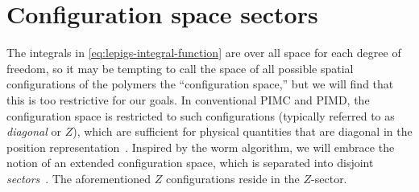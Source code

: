 \section{Configuration space sectors}

The integrals in \cref{eq:lepigs-integral-function} are over all space for each degree of freedom, so it may be tempting to call the space of all possible spatial configurations of the polymers the ``configuration space,'' but we will find that this is too restrictive for our goals.
In conventional PIMC and PIMD, the configuration space is restricted to such configurations (typically referred to as \emph{diagonal} or $Z$), which are sufficient for physical quantities that are diagonal in the position representation~\cite{boninsegni2006worm}.
Inspired by the worm algorithm, we will embrace the notion of an extended configuration space, which is separated into disjoint \emph{sectors}~\cite{prokof1998worm,boninsegni2006worm}.
The aforementioned $Z$ configurations reside in the $Z$-sector.

